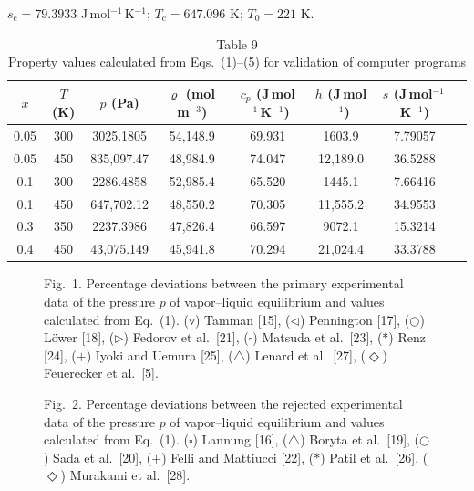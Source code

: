 \documentclass[11pt]{article}
\newcommand{\dens}{\varrho}
\newcommand{\Jmol}{J\,mol$^{-1}$}
\newcommand{\JmolK}{J\,mol$^{-1}$\,K$^{-1}$}
\newcommand{\molm}{mol\,m$^{-3}$}
\begin{document}
\begin{table}[htbp]
\vspace{2pt}
\footnotesize $s_\mathrm{c} = 79.3933$ \JmolK;
$T_\mathrm{c} = 647.096$ K; $T_0 = 221$ K.
\end{table}

\begin{table}[htbp]
\centering
\footnotesize
\caption*{Table 9\\ Property values calculated from Eqs.~(1)--(5) for
          validation of computer programs}
\setlength{\tabcolsep}{6pt}
\begin{tabular}{cccccccc}
\toprule
$x$ & $T$ (K) & $p$ (Pa) & $\dens$ (\molm) & $c_p$ (\JmolK)
 & $h$ (\Jmol) & $s$ (\JmolK) \\
\midrule
0.05 & 300 & 3025.1805  & 54,148.9 & 69.931 & 1603.9   & 7.79057 \\
0.05 & 450 & 835,097.47 & 48,984.9 & 74.047 & 12,189.0 & 36.5288 \\
0.1  & 300 & 2286.4858  & 52,985.4 & 65.520 & 1445.1   & 7.66416 \\
0.1  & 450 & 647,702.12 & 48,550.2 & 70.305 & 11,555.2 & 34.9553 \\
0.3  & 350 & 2237.3986  & 47,826.4 & 66.597 & 9072.1   & 15.3214 \\
0.4  & 450 & 43,075.149 & 45,941.8 & 70.294 & 21,024.4 & 33.3788 \\
\bottomrule
\end{tabular}
\end{table}


\begin{figure}[htbp]\centering
\caption*{Fig.~1. Percentage deviations between the primary
experimental data of the pressure $p$ of vapor--liquid equilibrium and
values calculated from Eq.~(1). ($\triangledown$) Tamman [15],
($\triangleleft$) Pennington [17], ($\bigcirc$) L\"ower [18],
($\triangleright$) Fedorov et al.\ [21], ($\square$) Matsuda et al.\ [23],
($*$) Renz [24], ($+$) Iyoki and Uemura [25],
($\triangle$) Lenard et al.\ [27], ($\Diamond$) Feuerecker et al.\ [5].}
\end{figure}

\begin{figure}[htbp]\centering
\caption*{Fig.~2. Percentage deviations between the rejected
experimental data of the pressure $p$ of vapor--liquid equilibrium and
values calculated from Eq.~(1). ($\square$) Lannung [16],
($\triangle$) Boryta et al.\ [19], ($\bigcirc$) Sada et al.\ [20],
($+$) Felli and Mattiucci [22], ($*$) Patil et al.\ [26],
($\Diamond$) Murakami et al.\ [28].}
\end{figure}
\end{document}
